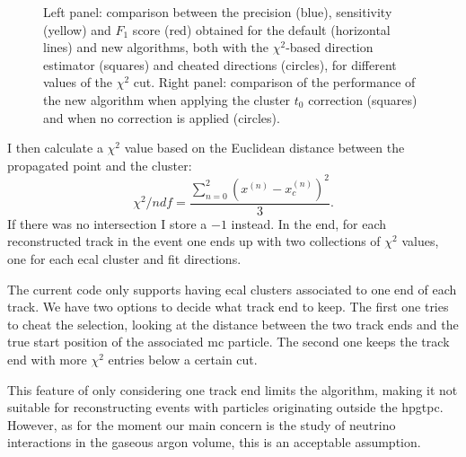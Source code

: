 \begin{figure}[t]
\begin{subfigure}{0.5\textwidth}
	\end{subfigure}
	\caption[Performance of the new track-cluster association algorithm for different values of the $\chi^{2}$ cut.]{Left panel: comparison between the precision (blue), sensitivity (yellow) and $F_{1}$ score (red) obtained for the default (horizontal lines) and new algorithms, both with the $\chi^{2}$-based direction estimator (squares) and cheated directions (circles), for different values of the $\chi^{2}$ cut. Right panel: comparison of the performance of the new algorithm when applying the cluster $t_{0}$ correction (squares) and when no correction is applied (circles).}
	\label{fig:associations}
\end{figure}

I then calculate a $\chi^{2}$ value based on the Euclidean distance between the propagated point and the cluster:
\begin{equation}
	\chi^{2}/ndf = \frac{\sum_{n=0}^{2}\left(x^{(n)}-x^{(n)}_{c}\right)^{2}}{3}.
\end{equation}
If there was no intersection I store a $-1$ instead. In the end, for each reconstructed track in the event one ends up with two collections of $\chi^{2}$ values, one for each \gls{ecal} cluster and fit directions.

The current code only supports having \gls{ecal} clusters associated to one end of each track. We have two options to decide what track end to keep. The first one tries to cheat the selection, looking at the distance between the two track ends and the true start position of the associated \gls{mc} particle. The second one keeps the track end with more $\chi^{2}$ entries below a certain cut.

This feature of only considering one track end limits the algorithm, making it not suitable for reconstructing events with particles originating outside the \gls{hpgtpc}. However, as for the moment our main concern is the study of neutrino interactions in the gaseous argon volume, this is an acceptable assumption.

